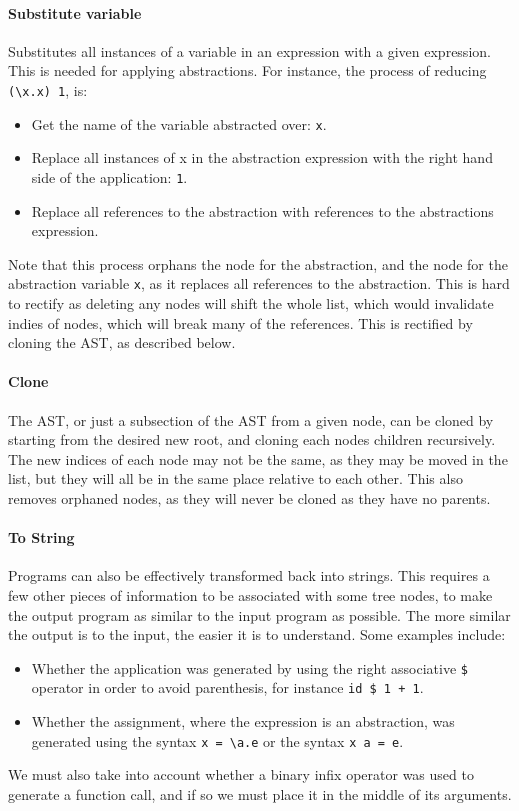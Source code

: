 \paragraph{Substitute variable} Substitutes all instances of a variable in an expression with a given expression. This is needed for applying abstractions. For instance, the process of reducing \verb|(\x.x) 1|, is:
\begin{itemize}
    \item Get the name of the variable abstracted over: \verb|x|.
    \item Replace all instances of x in the abstraction expression with the right hand side of the application: \verb|1|.
    \item Replace all references to the abstraction with references to the abstractions expression. 
\end{itemize}

\noindent Note that this process orphans the node for the abstraction, and the node for the abstraction variable \verb|x|, as it replaces all references to the abstraction. This is hard to rectify as deleting any nodes will shift the whole list, which would invalidate indies of nodes, which will break many of the references. This is rectified by cloning the AST, as described below.

\paragraph{Clone} \label{c1_paragraph_clone} The AST, or just a subsection of the \ac{AST} from a given node, can be cloned by starting from the desired new root, and cloning each nodes children recursively. The new indices of each node may not be the same, as they may be moved in the list, but they will all be in the same place relative to each other. This also removes orphaned nodes, as they will never be cloned as they have no parents. 

\paragraph{To String} \label{paragraph:to_string} Programs can also be effectively transformed back into strings. This requires a few other pieces of information to be associated with some tree nodes, to make the output program as similar to the input program as possible. The more similar the output is to the input, the easier it is to understand. Some examples include:
\begin{itemize}
    \item Whether the application was generated by using the right associative \verb|$| operator in order to avoid parenthesis, for instance \verb|id $ 1 + 1|. 
    \item Whether the assignment, where the expression is an abstraction, was generated using the syntax \verb|x = \a.e| or the syntax \verb|x a = e|. 
\end{itemize}
We must also take into account whether a binary infix operator was used to generate a function call, and if so we must place it in the middle of its arguments. 

